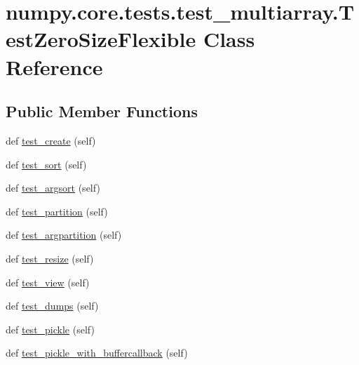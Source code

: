 \hypertarget{classnumpy_1_1core_1_1tests_1_1test__multiarray_1_1TestZeroSizeFlexible}{}\section{numpy.\+core.\+tests.\+test\+\_\+multiarray.\+Test\+Zero\+Size\+Flexible Class Reference}
\label{classnumpy_1_1core_1_1tests_1_1test__multiarray_1_1TestZeroSizeFlexible}
\subsection*{Public Member Functions}
\begin{DoxyCompactItemize}
\item 
def \hyperlink{classnumpy_1_1core_1_1tests_1_1test__multiarray_1_1TestZeroSizeFlexible_aed00652c3b15fc0631e1e11d6df99483}{test\+\_\+create} (self)
\item 
def \hyperlink{classnumpy_1_1core_1_1tests_1_1test__multiarray_1_1TestZeroSizeFlexible_a8bdbbe4c2e723020197c84ba9cae1529}{test\+\_\+sort} (self)
\item 
def \hyperlink{classnumpy_1_1core_1_1tests_1_1test__multiarray_1_1TestZeroSizeFlexible_a5890f750eb50057e750a7918f7141c83}{test\+\_\+argsort} (self)
\item 
def \hyperlink{classnumpy_1_1core_1_1tests_1_1test__multiarray_1_1TestZeroSizeFlexible_ab4dd8521d46ccaa2db1a95bf899c1229}{test\+\_\+partition} (self)
\item 
def \hyperlink{classnumpy_1_1core_1_1tests_1_1test__multiarray_1_1TestZeroSizeFlexible_a65685399d6286191c411e96d900c8b41}{test\+\_\+argpartition} (self)
\item 
def \hyperlink{classnumpy_1_1core_1_1tests_1_1test__multiarray_1_1TestZeroSizeFlexible_a18ea3a535bea36c8503cbd9ba4ab90ac}{test\+\_\+resize} (self)
\item 
def \hyperlink{classnumpy_1_1core_1_1tests_1_1test__multiarray_1_1TestZeroSizeFlexible_a4f553cef0fb881ea6b8b45ee13c8c37b}{test\+\_\+view} (self)
\item 
def \hyperlink{classnumpy_1_1core_1_1tests_1_1test__multiarray_1_1TestZeroSizeFlexible_ab4614cd8a4a569a87c4f7e889a77726c}{test\+\_\+dumps} (self)
\item 
def \hyperlink{classnumpy_1_1core_1_1tests_1_1test__multiarray_1_1TestZeroSizeFlexible_aeb1a5c996368521dc157c3926a636c62}{test\+\_\+pickle} (self)
\item 
def \hyperlink{classnumpy_1_1core_1_1tests_1_1test__multiarray_1_1TestZeroSizeFlexible_ad5be79946602e51ade1636d6f45d6004}{test\+\_\+pickle\+\_\+with\+\_\+buffercallback} (self)
\end{DoxyCompactItemize}
